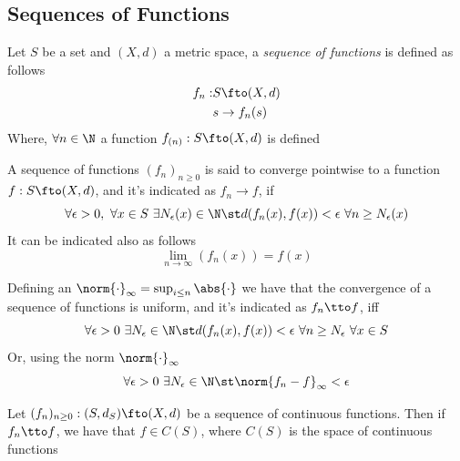 \documentclass[../mmf.tex]{subfiles}
\begin{document}
\subsection{Sequences of Functions}
\begin{dfn}
	Let $S$ be a set and $(X,d)$ a metric space, a \textit{sequence of functions} is defined as follows
	\begin{equation}
		\begin{aligned}
			f_n:&S\fto(X,d)\\
			&s\to f_n(s)
		\end{aligned}
		\label{eq:seqfunc}
	\end{equation}
	Where, $\forall n\in\N$ a function $f_{(n)}:S\fto(X,d)$ is defined
\end{dfn}
\begin{dfn}
	A sequence of functions $(f_n)_{n\ge0}$ is said to converge pointwise to a function $f:S\fto(X,d)$, and it's indicated as $f_n\to f$, if
	\begin{equation}
		\forall\epsilon>0,\ \forall x\in S\ \exists N_\epsilon(x)\in\N\st d(f_n(x),f(x))<\epsilon\ \forall n\ge N_\epsilon(x)
		\label{eq:pointwiseconv}
	\end{equation}
	It can be indicated also as follows
	\begin{equation}
		\lim_{n\to\infty}(f_n(x))=f(x)
		\label{eq:pointwiseconv2}
	\end{equation}
\end{dfn}
\begin{dfn}
	Defining an $\norm{\cdot}_\infty=\sup_{i\le n}\abs{\cdot}$ we have that the convergence of a sequence of functions is uniform, and it's indicated as $f_n\tto f$, iff
	\begin{equation}
		\forall\epsilon>0\ \exists N_\epsilon\in\N\st d(f_n(x),f(x))<\epsilon\ \forall n\ge N_\epsilon\ \forall x\in S
		\label{eq:uniformconv}
	\end{equation}
	Or, using the norm $\norm{\cdot}_{\infty}$
	\begin{equation}
		\forall\epsilon>0\ \exists N_\epsilon\in\N\st\norm{f_n-f}_{\infty}<\epsilon
		\label{eq:uniformconv2}
	\end{equation}
\end{dfn}
\begin{thm}
	Let $(f_n)_{n\ge0}:(S,d_S)\fto(X,d)$ be a sequence of continuous functions. Then if $f_n\tto f$, we have that $f\in C(S)$, where $C(S)$ is the space of continuous functions
\end{thm}
\end{document}
